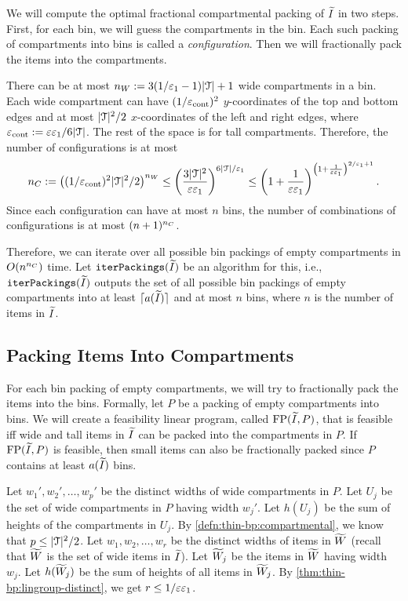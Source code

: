 We will compute the optimal fractional compartmental packing of $\widetilde{I}$ in two steps.
First, for each bin, we will guess the compartments in the bin.
Each such packing of compartments into bins is called a \emph{configuration}.
Then we will fractionally pack the items into the compartments.

There can be at most $n_W := 3(1/\varepsilon_1-1)|\mathcal{T}| + 1$ wide compartments in a bin.
Each wide compartment can have $(1/\varepsilon_{\mathrm{cont}})^2$ $y$-coordinates
of the top and bottom edges and at most $|\mathcal{T}|^2/2$ $x$-coordinates
of the left and right edges, where $\varepsilon_{\mathrm{cont}} := \varepsilon\varepsilon_1/6|\mathcal{T}|$.
The rest of the space is for tall compartments.
Therefore, the number of configurations is at most
\[ n_C := \left((1/\varepsilon_{\mathrm{cont}})^2|\mathcal{T}|^2/2\right)^{n_W}
    \le \left(\frac{3|\mathcal{T}|^2}{\varepsilon\varepsilon_1}\right)^{6|\mathcal{T}|/\varepsilon_1}
    \le \left(1+\frac{1}{\varepsilon\varepsilon_1}\right)^{
        \left(1+\frac{1}{\varepsilon\varepsilon_1}\right)^{2/\varepsilon_1 + 1}}. \]
Since each configuration can have at most $n$ bins, the number of combinations
of configurations is at most $(n+1)^{n_C}$.

Therefore, we can iterate over all possible bin packings of empty compartments in $O(n^{n_C})$ time.
Let $\operatorname{\mathtt{iterPackings}}(\widetilde{I})$ be an algorithm for this, i.e.,
$\operatorname{\mathtt{iterPackings}}(\widetilde{I})$ outputs the set of all possible bin packings of empty compartments into
at least $\lceil a(\widetilde{I}) \rceil$ and at most $n$ bins,
where $n$ is the number of items in $\widetilde{I}$.

\subsection{Packing Items Into Compartments}
\label{sec:feas-lp}

For each bin packing of empty compartments, we will try to
fractionally pack the items into the bins.
Formally, let $P$ be a packing of empty compartments into bins.
We will create a feasibility linear program, called $\operatorname{FP}(\widetilde{I}, P)$,
that is feasible iff wide and tall items in $\widetilde{I}$ can be packed
into the compartments in $P$.
If $\operatorname{FP}(\widetilde{I}, P)$ is feasible, then small items can also be
fractionally packed since $P$ contains at least $a(\widetilde{I})$ bins.

Let $w_1', w_2', \ldots, w_p'$ be the distinct widths of wide compartments in $P$.
Let $U_j$ be the set of wide compartments in $P$ having width $w_j'$.
Let $h(U_j)$ be the sum of heights of the compartments in $U_j$.
By \cref{defn:thin-bp:compartmental}, we know that $p \le |\mathcal{T}|^2/2$.
Let $w_1, w_2, \ldots, w_r$ be the distinct widths of items in $\widetilde{W}$
(recall that $\widetilde{W}$ is the set of wide items in $\widetilde{I}$).
Let $\widetilde{W}_j$ be the items in $\widetilde{W}$ having width $w_j$.
Let $h(\widetilde{W}_j)$ be the sum of heights of all items in $\widetilde{W}_j$.
By \cref{thm:thin-bp:lingroup-distinct}, we get $r \le 1/\varepsilon\varepsilon_1$.

